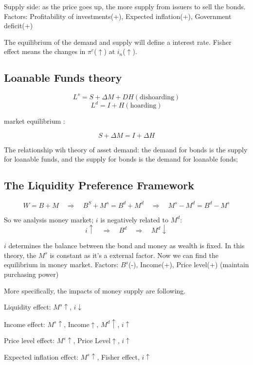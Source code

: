\documentclass[10pt, a4paper]{article}
\begin{document}
        Supply side: as the price goes up, the more supply from issuers to sell the bonds. Factors: Profitability of investments(+), Expected inflation(+), Government deficit(+)

        The equilibrium of the demand and supply will define a interest rate. Fisher effect means the changes in $\pi^e$($\uparrow$) at $i_n$($\uparrow$). 


    \subsection{Loanable Funds theory}
        $$L^s = S + \Delta M + DH(\text{dishoarding})$$
        $$L^d = I + H(\text{hoarding})$$

        market equilibrium : 

        $$S + \Delta M = I + \Delta H$$

        The relationship wih theory of asset demand: the demand for bonds is the supply for loanable funds, and the supply for bonds is the demand for loanable fonds;

    \subsection{The Liquidity Preference Framework}
        $$W = B + M\quad \Rightarrow \quad B^S + M^s = B^d + M^d\quad \Rightarrow \quad M^s - M^d = B^d - M^s$$

        So we analysis money market; $i$ is negatively related to $M^d$: 
        $$i\uparrow\quad \Rightarrow \quad B^d \quad \Rightarrow \quad M^d\downarrow $$

        $i$ determines the balance between the bond and money as wealth is fixed. In this theory, the $M^s$ is constant as it's a external factor. Now we can find the equilibrium in money market. Factors: $B^s$(-), Income(+), Price level(+) (maintain purchasing power) 
        
        More specifically, the impacts of money supply are following.
        
        \quad Liquidity effect: $M^s \uparrow$, $i\downarrow$
        
        \quad Income effect: $M^s \uparrow$, Income$\uparrow$, $M^d\uparrow$, $i\uparrow$

        \quad Price level effect: $M^s \uparrow$, Price Level$\uparrow$, $i\uparrow$

        \quad Expected inflation effect: $M^s \uparrow$, Fisher effect, $i\uparrow$
\end{document}

